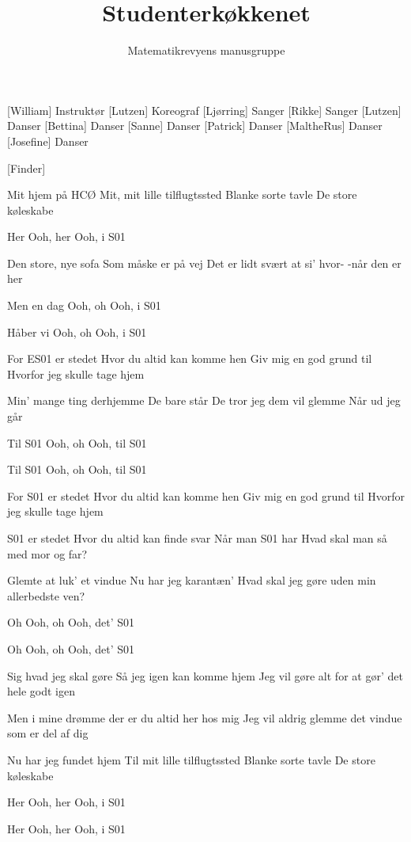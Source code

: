 \documentclass[a4paper,11pt]{article}
\title{Studenterkøkkenet}
\author{Matematikrevyens manusgruppe}
\begin{document}
\maketitle

\begin{roles}
[William] Instruktør
[Lutzen] Koreograf
[Ljørring] Sanger
[Rikke] Sanger
[Lutzen] Danser
[Bettina] Danser
[Sanne] Danser
[Patrick] Danser
[MaltheRus] Danser
[Josefine] Danser
\end{roles}

\begin{props}
[Finder]
\end{props}

\begin{song}
Mit hjem på HCØ
Mit, mit lille tilflugtssted
Blanke sorte tavle
De store køleskabe

Her
Ooh, her
Ooh, i S01

Den store, nye sofa
Som måske er på vej
Det er lidt svært at si' hvor-
-når den er her

Men en dag
Ooh, oh
Ooh, i S01

Håber vi
Ooh, oh
Ooh, i S01

For ES01 er stedet
Hvor du altid kan komme hen
Giv mig en god grund til
Hvorfor jeg skulle tage hjem

Min' mange ting derhjemme
De bare står
De tror jeg dem vil glemme
Når ud jeg går

Til S01
Ooh, oh
Ooh, til S01

Til S01
Ooh, oh
Ooh, til S01

For S01 er stedet
Hvor du altid kan komme hen
Giv mig en god grund til
Hvorfor jeg skulle tage hjem

S01 er stedet
Hvor du altid kan finde svar
Når man S01 har
Hvad skal man så med mor og far?

Glemte at luk' et vindue
Nu har jeg karantæn'
Hvad skal jeg gøre uden
min allerbedste ven?

Oh
Ooh, oh
Ooh, det' S01

Oh
Ooh, oh
Ooh, det' S01

Sig hvad jeg skal gøre
Så jeg igen kan komme hjem
Jeg vil gøre alt for 
at gør' det hele godt igen

Men i mine drømme
der er du altid her hos mig
Jeg vil aldrig glemme
det vindue som er del af dig

Nu har jeg fundet hjem
Til mit lille tilflugtssted
Blanke sorte tavle 
De store køleskabe

Her
Ooh, her
Ooh, i S01

Her
Ooh, her
Ooh, i S01
\end{song}
\end{document}
